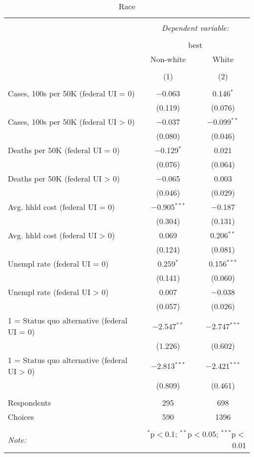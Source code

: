 
\begin{table}[!htbp] \centering 
  \caption{Race} 
  \label{} 
\begin{tabular}{@{\extracolsep{5pt}}lcc} 
\\[-1.8ex]\hline 
\hline \\[-1.8ex] 
 & \multicolumn{2}{c}{\textit{Dependent variable:}} \\ 
\cline{2-3} 
\\[-1.8ex] & \multicolumn{2}{c}{best} \\ 
 & Non-white & White \\ 
\\[-1.8ex] & (1) & (2)\\ 
\hline \\[-1.8ex] 
 Cases, 100s per 50K (federal UI = 0) & $-$0.063 & 0.146$^{*}$ \\ 
  & (0.119) & (0.076) \\ 
  Cases, 100s per 50K (federal UI > 0) & $-$0.037 & $-$0.099$^{**}$ \\ 
  & (0.080) & (0.046) \\ 
  Deaths per 50K (federal UI = 0) & $-$0.129$^{*}$ & 0.021 \\ 
  & (0.076) & (0.064) \\ 
  Deaths per 50K (federal UI > 0) & $-$0.065 & 0.003 \\ 
  & (0.046) & (0.029) \\ 
  Avg. hhld cost (federal UI = 0) & $-$0.905$^{***}$ & $-$0.187 \\ 
  & (0.304) & (0.131) \\ 
  Avg. hhld cost (federal UI > 0) & 0.069 & 0.206$^{**}$ \\ 
  & (0.124) & (0.081) \\ 
  Unempl rate (federal UI = 0) & 0.259$^{*}$ & 0.156$^{***}$ \\ 
  & (0.141) & (0.060) \\ 
  Unempl rate (federal UI > 0) & 0.007 & $-$0.038 \\ 
  & (0.057) & (0.026) \\ 
  1 = Status quo alternative (federal UI = 0) & $-$2.547$^{**}$ & $-$2.747$^{***}$ \\ 
  & (1.226) & (0.602) \\ 
  1 = Status quo alternative (federal UI > 0) & $-$2.813$^{***}$ & $-$2.421$^{***}$ \\ 
  & (0.809) & (0.461) \\ 
 \hline \\[-1.8ex] 
Respondents & 295 & 698\\ 
 Choices & 590 & 1396\\ 
\hline 
\hline \\[-1.8ex] 
\textit{Note:}  & \multicolumn{2}{r}{$^{*}$p$<$0.1; $^{**}$p$<$0.05; $^{***}$p$<$0.01} \\ 
\end{tabular} 
\end{table} 
